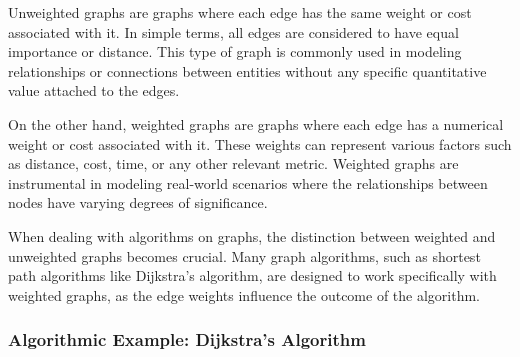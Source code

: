 \documentclass[12pt]{book} %
\begin{document}
Unweighted graphs are graphs where each edge has the same weight or cost associated with it. In simple terms, all edges are considered to have equal importance or distance. This type of graph is commonly used in modeling relationships or connections between entities without any specific quantitative value attached to the edges.

On the other hand, weighted graphs are graphs where each edge has a numerical weight or cost associated with it. These weights can represent various factors such as distance, cost, time, or any other relevant metric. Weighted graphs are instrumental in modeling real-world scenarios where the relationships between nodes have varying degrees of significance.

When dealing with algorithms on graphs, the distinction between weighted and unweighted graphs becomes crucial. Many graph algorithms, such as shortest path algorithms like Dijkstra's algorithm, are designed to work specifically with weighted graphs, as the edge weights influence the outcome of the algorithm.

\subsubsection*{Algorithmic Example: Dijkstra's Algorithm}
\end{document}
